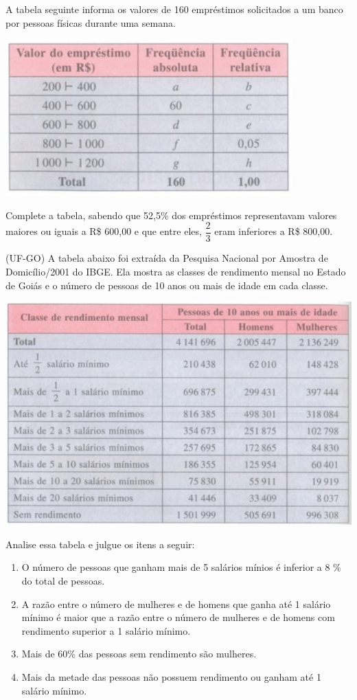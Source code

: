 	\item A tabela seguinte informa os valores de 160 empréstimos solicitados a um banco por pessoas físicas durante uma semana.
	
	\begin{center}
		\includegraphics[scale=0.7]{figuras/fig107.png}
	\end{center}
	
	Complete a tabela, sabendo que 52,5\% dos empréstimos representavam valores maiores ou iguais a R\$ 600,00 e que entre eles, $\dfrac{2}{3}$ eram inferiores a R\$ 800,00.
	
	\item (UF-GO) A tabela abaixo foi extraída da Pesquisa Nacional por Amostra de Domicílio/2001 do IBGE. Ela mostra as classes de rendimento mensal no Estado de Goiás e o número de pessoas de 10 anos ou mais de idade em cada classe.
	
	\begin{center}
		\includegraphics[scale=0.7]{figuras/fig108.png}
	\end{center}
	
	Analise essa tabela e julgue os itens a seguir:
	\begin{enumerate}[1)]
		\item O número de pessoas que ganham mais de 5 salários mínios é inferior a 8 \% do total de pessoas.
		\item A razão entre o número de mulheres e de homens que ganha até 1 salário mínimo é maior que a razão entre o número de mulheres e de homens com rendimento superior a 1 salário mínimo.
		\item Mais de 60\% das pessoas sem rendimento são mulheres.
		\item Mais da metade das pessoas não possuem rendimento ou ganham até 1 salário mínimo.
	\end{enumerate}	


